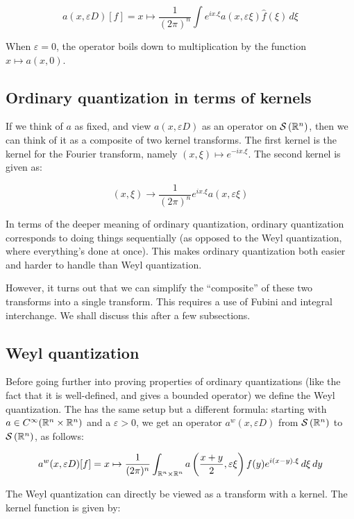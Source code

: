 \documentclass[a4paper]{amsart}
\newcommand{\schwarz}[1]{\mathcal{S}\left(#1\right)}
\begin{document}
$$a(x,\varepsilon D)[f] = x \mapsto \frac{1}{(2\pi)^n} \int e^{ix.\xi} a(x,\varepsilon \xi) \hat{f}(\xi) \, d\xi$$

When $\varepsilon=0$, the operator boils down to multiplication by the
function $x \mapsto a(x,0)$.

\subsection{Ordinary quantization in terms of kernels}

If we think of $a$ as fixed, and view $a(x,\varepsilon D)$ as an
operator on $\schwarz{\R^n}$, then we can think of it as a composite of two
kernel transforms. The first kernel is the kernel for the Fourier
transform, namely $(x,\xi) \mapsto e^{-ix.\xi}$.  The second kernel is
given as:

$$(x,\xi) \to \frac{1}{(2\pi)^n} e^{ix.\xi} a(x,\varepsilon \xi)$$

In terms of the deeper meaning of ordinary quantization, ordinary
quantization corresponds to doing things sequentially (as opposed to
the Weyl quantization, where everything's done at once). This makes
ordinary quantization both easier and harder to handle than Weyl
quantization.

However, it turns out that we can simplify the ``composite'' of these
two transforms into a single transform. This requires a use of Fubini
and integral interchange. We shall discuss this after a few
subsections.

\subsection{Weyl quantization}

Before going further into proving properties of ordinary quantizations
(like the fact that it is well-defined, and gives a bounded operator)
we define the Weyl quantization. The 
has the same setup but a different formula: starting with $a \in
C^\infty(\mathbb{R}^n \times \mathbb{R}^n)$ and a $\varepsilon > 0$, we get an
operator $a^w(x, \varepsilon D)$ from $\schwarz{\R^n}$ to
$\schwarz{\R^n}$, as follows:

$$a^w(x, \varepsilon D)[f] = x \mapsto \frac{1}{(2\pi)^n} \int_{\mathbb{R}^n \times \mathbb{R}^n} a \left(\frac{x+y}{2}, \varepsilon \xi \right) f(y) e^{i(x-y).\xi} \, d\xi \, dy$$

The Weyl quantization can directly be viewed as a transform with a kernel. The kernel function is given by:
\end{document}
